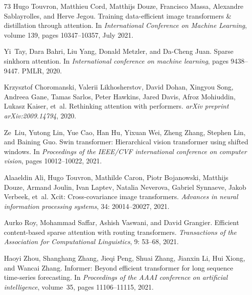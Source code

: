 \documentclass{article}
\begin{document}
\begin{thebibliography}{73}
Hugo Touvron, Matthieu Cord, Matthijs Douze, Francisco Massa, Alexandre
  Sablayrolles, and Herve Jegou.
\newblock Training data-efficient image transformers \& distillation through
  attention.
\newblock In \emph{International Conference on Machine Learning}, volume 139,
  pages 10347--10357, July 2021{}.

Yi~Tay, Dara Bahri, Liu Yang, Donald Metzler, and Da-Cheng Juan.
\newblock Sparse sinkhorn attention.
\newblock In \emph{International conference on machine learning}, pages
  9438--9447. PMLR, 2020.

Krzysztof Choromanski, Valerii Likhosherstov, David Dohan, Xingyou Song,
  Andreea Gane, Tamas Sarlos, Peter Hawkins, Jared Davis, Afroz Mohiuddin,
  Lukasz Kaiser, et~al.
\newblock Rethinking attention with performers.
\newblock \emph{arXiv preprint arXiv:2009.14794}, 2020.

Ze~Liu, Yutong Lin, Yue Cao, Han Hu, Yixuan Wei, Zheng Zhang, Stephen Lin, and
  Baining Guo.
\newblock Swin transformer: Hierarchical vision transformer using shifted
  windows.
\newblock In \emph{Proceedings of the IEEE/CVF international conference on
  computer vision}, pages 10012--10022, 2021.

Alaaeldin Ali, Hugo Touvron, Mathilde Caron, Piotr Bojanowski, Matthijs Douze,
  Armand Joulin, Ivan Laptev, Natalia Neverova, Gabriel Synnaeve, Jakob
  Verbeek, et~al.
\newblock Xcit: Cross-covariance image transformers.
\newblock \emph{Advances in neural information processing systems},
  34: 20014--20027, 2021.

Aurko Roy, Mohammad Saffar, Ashish Vaswani, and David Grangier.
\newblock Efficient content-based sparse attention with routing transformers.
\newblock \emph{Transactions of the Association for Computational Linguistics},
  9: 53--68, 2021.

Haoyi Zhou, Shanghang Zhang, Jieqi Peng, Shuai Zhang, Jianxin Li, Hui Xiong,
  and Wancai Zhang.
\newblock Informer: Beyond efficient transformer for long sequence time-series
  forecasting.
\newblock In \emph{Proceedings of the AAAI conference on artificial
  intelligence}, volume~35, pages 11106--11115, 2021.


\end{thebibliography}
\end{document}
